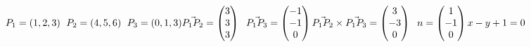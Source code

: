 \subsection{}
\begin{math}
    P_1=(1,2,3)
    \hspace{6px}
    P_2=(4,5,6)
    \hspace{6px}
    P_3=(0,1,3)
    \\
    \vec{P_1P_2}=\begin{pmatrix}
        3\\
        3\\
        3
    \end{pmatrix}
    \hspace{6px}
    \vec{P_1P_3}=\begin{pmatrix}
        -1\\
        -1\\
        0
    \end{pmatrix}
    \\
    \vec{P_1P_2}\times \vec{P_1P_3}
    =\begin{pmatrix}
        3\\
        -3\\
        0
    \end{pmatrix}
    \hspace{6px}
    n=\begin{pmatrix}
        1\\
        -1\\
        0
    \end{pmatrix}
    \\
    x-y+1=0
\end{math}